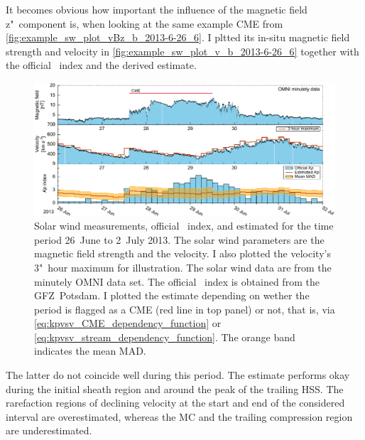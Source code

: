 It becomes obvious how important the influence of the magnetic field z"~component is, when looking at the same example CME from \autoref{fig:example_sw_plot_vBz_b_2013-6-26_6}. I pltted its in-situ magnetic field strength and velocity in \autoref{fig:example_sw_plot_v_b_2013-6-26_6} together with the official \Kp{}~index and the derived \Kp{} estimate.
\begin{figure}[htb]
	\centering
	\includegraphics[width=\textwidth]{figures_of_mine/chapter2/example_sw_plot_v_b_2013-6-26_6.pdf}
	\caption[]
	{Solar wind measurements, official \Kp{}~index, and estimated \Kp{} for the time period 26~June to 2~July 2013. The solar wind parameters are the magnetic field strength and the velocity. I also plotted the velocity's 3"~hour maximum for illustration. The solar wind data are from the minutely OMNI data set. The official \Kp{}~index is obtained from the GFZ~Potsdam. I plotted the \Kp{} estimate depending on wether the period is flagged as a CME (red line in top panel) or not, that is, via \autoref{eq:kpvsv_CME_dependency_function} or \autoref{eq:kpvsv_stream_dependency_function}. The orange band indicates the mean MAD.}
	\label{fig:example_sw_plot_v_b_2013-6-26_6}
\end{figure}
The latter do not coincide well during this period. The \Kp{} estimate performs okay during the initial sheath region and around the peak of the trailing HSS. The rarefaction regions of declining velocity at the start and end of the considered interval are overestimated, whereas the MC and the trailing compression region are underestimated.\\


